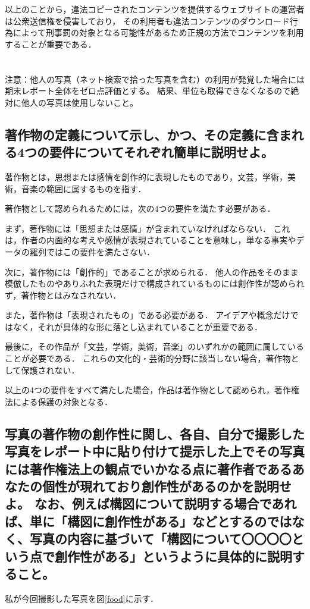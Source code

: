 \documentclass[titlepage,a4paper]{jsarticle}
\begin{document}
以上のことから，違法コピーされたコンテンツを提供するウェブサイトの運営者は公衆送信権を侵害しており，
その利用者も違法コンテンツのダウンロード行為によって刑事罰の対象となる可能性があるため正規の方法でコンテンツを利用することが重要である．
\section{ }
注意：他人の写真（ネット検索で拾った写真を含む）の利用が発覚した場合には期末レポート全体をゼロ点評価とする。
結果、単位も取得できなくなるので絶対に他人の写真は使用しないこと。
\subsection{著作物の定義について示し、かつ、その定義に含まれる4つの要件についてそれぞれ簡単に説明せよ。}
著作物とは，思想または感情を創作的に表現したものであり，文芸，学術，美術，音楽の範囲に属するものを指す．\cite{task3_1}

著作物として認められるためには，次の4つの要件を満たす必要がある．

まず，著作物には「思想または感情」が含まれていなければならない．
これは，作者の内面的な考えや感情が表現されていることを意味し，単なる事実やデータの羅列ではこの要件を満たさない．

次に，著作物には「創作的」であることが求められる．
他人の作品をそのまま模倣したものやありふれた表現だけで構成されているものには創作性が認められず，著作物とはみなされない．

また，著作物は「表現されたもの」である必要がある．
アイデアや概念だけではなく，それが具体的な形に落とし込まれていることが重要である．

最後に，その作品が「文芸，学術，美術，音楽」のいずれかの範囲に属していることが必要である．
これらの文化的・芸術的分野に該当しない場合，著作物として保護されない．

以上の4つの要件をすべて満たした場合，作品は著作物として認められ，著作権法による保護の対象となる．

\newpage
\subsection{写真の著作物の創作性に関し、各自、自分で撮影した写真をレポート中に貼り付けて提示した上でその写真には著作権法上の観点でいかなる点に著作者であるあなたの個性が現れており創作性があるのかを説明せよ。
  なお、例えば構図について説明する場合であれば、単に「構図に創作性がある」などとするのではなく、写真の内容に基づいて「構図について〇〇〇〇という点で創作性がある」というように具体的に説明すること。}
私が今回撮影した写真を図\ref{food}に示す．
\end{document}
